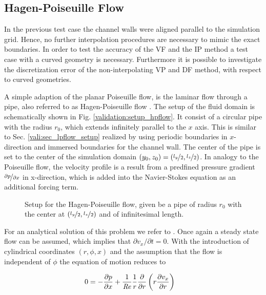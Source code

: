 \subsection{Hagen-Poiseuille Flow}

In the previous test case the channel walls were aligned parallel to the simulation grid. Hence, no further interpolation procedures
are necessary to mimic the exact boundaries.
In order to test the accuracy of the VF and the IP method a test case with a curved geometry is necessary.
Furthermore it is possible to investigate the discretization error of the non-interpolating VP and DF method, with respect to curved geometries.

A simple adaption of the planar Poiseuille flow, is the laminar flow through a pipe, also referred to as Hagen-Poiseuille flow \citep{tritton88}.
The setup of the fluid domain is schematically shown in Fig. \ref{validation:setup_hpflow}.
It consist of a circular pipe with the radius $r_0$, which extends infinitely parallel to the $x$ axis.
This is similar to Sec. \ref{vali:sec_lpflow_setup} realized by using periodic boundaries in $x$-direction
and immersed boundaries for the channel wall.
The center of the pipe is set to the center of the simulation domain ${(y_0, z_0) = (\nicefrac{l_y}{2}, \nicefrac{l_z}{2})}$.
In analogy to the Poiseuille flow, the velocity profile is a result from a predfined pressure gradient $\nicefrac{\partial p}{\partial x}$ in x-direction,
which  is added into the Navier-Stokes equation as an additional forcing term.

\begin{figure}[!bp]
      \centering
      \caption{Setup for the Hagen-Poiseuille flow, given be a pipe of radius $r_0$ with the center at  ${(\nicefrac{l_y}{2}, \nicefrac{l_z}{2})}$ and of infinitesimal length.}
\end{figure}

For an analytical solution of this problem we refer to \citep{Kundu2012}.
Once again a steady state flow can be assumed, which implies that $\partial v_x/\partial t = 0$. With the introduction of cylindrical coordinates $(r, \phi, x)$
and the assumption that the flow is independent of $\phi$ the equation of motion reduces to

\begin{align}
    \label{vali:hpflow:navstok}
        0 &= - \frac{\partial p}{\partial x}  +  \frac{1}{\mbox{\textit{Re}}} \frac{1}{r}\frac{\partial}{\partial r}\left(r\frac{\partial v_x}{\partial r}\right)
\end{align}

